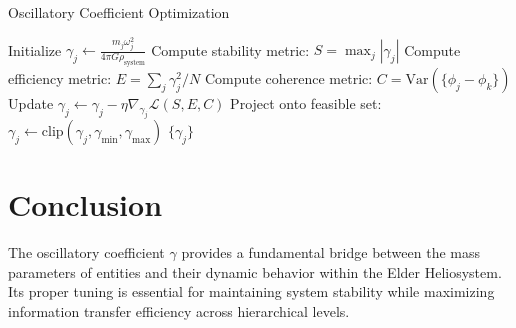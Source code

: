 \begin{algorithm}
\caption{Oscillatory Coefficient Optimization}
\begin{algorithmic}[1]
    \State Initialize $\gamma_j \gets \frac{m_j \omega_j^2}{4\pi G \rho_{\text{system}}}$
        \State Compute stability metric: $S = \max_j |\gamma_j|$
        \State Compute efficiency metric: $E = \sum_j \gamma_j^2 / N$
        \State Compute coherence metric: $C = \text{Var}(\{\phi_j - \phi_k\})$
        \State Update $\gamma_j \gets \gamma_j - \eta \nabla_{\gamma_j} \mathcal{L}(S, E, C)$
        \State Project onto feasible set: $\gamma_j \gets \text{clip}(\gamma_j, \gamma_{\min}, \gamma_{\max})$
    \EndWhile
    \State \Return $\{\gamma_j\}$
\EndFunction
\end{algorithmic}
\end{algorithm}

\section{Conclusion}

The oscillatory coefficient $\gamma$ provides a fundamental bridge between the mass parameters of entities and their dynamic behavior within the Elder Heliosystem. Its proper tuning is essential for maintaining system stability while maximizing information transfer efficiency across hierarchical levels.